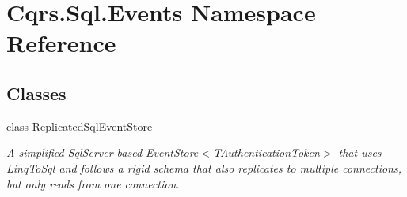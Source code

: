 \hypertarget{namespaceCqrs_1_1Sql_1_1Events}{}\section{Cqrs.\+Sql.\+Events Namespace Reference}
\label{namespaceCqrs_1_1Sql_1_1Events}
\subsection*{Classes}
\begin{DoxyCompactItemize}
\item 
class \hyperlink{classCqrs_1_1Sql_1_1Events_1_1ReplicatedSqlEventStore}{Replicated\+Sql\+Event\+Store}
\begin{DoxyCompactList}\small\item\em A simplified Sql\+Server based \hyperlink{classCqrs_1_1Events_1_1EventStore_a6346cb2aea4c5b4e740dc6cfb15abab8_a6346cb2aea4c5b4e740dc6cfb15abab8}{Event\+Store$<$\+T\+Authentication\+Token$>$} that uses Linq\+To\+Sql and follows a rigid schema that also replicates to multiple connections, but only reads from one connection. \end{DoxyCompactList}\end{DoxyCompactItemize}
